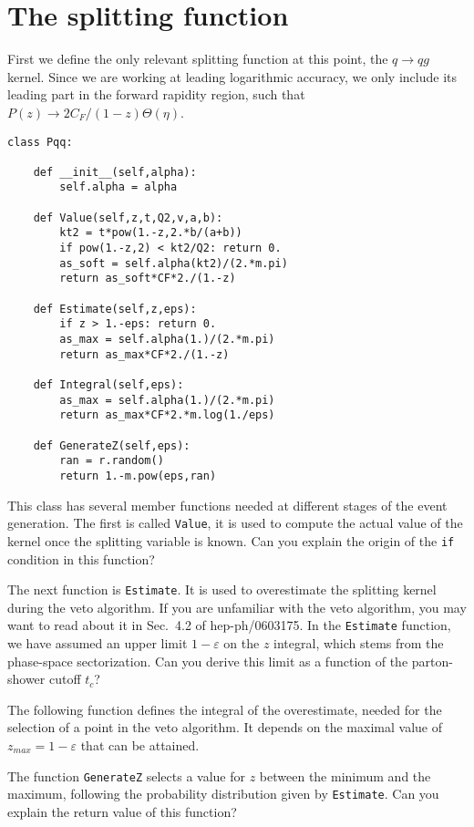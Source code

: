 \documentclass[10pt,fleqn]{scrartcl}
\begin{document}
\section{The splitting function}
First we define the only relevant splitting function at this point, the $q\to qg$ kernel.
Since we are working at leading logarithmic accuracy, we only include its leading part
in the forward rapidity region, such that $P(z)\to 2C_F/(1-z)\Theta(\eta)$.
\begin{verbatim}
class Pqq:

    def __init__(self,alpha):
        self.alpha = alpha

    def Value(self,z,t,Q2,v,a,b):
        kt2 = t*pow(1.-z,2.*b/(a+b))
        if pow(1.-z,2) < kt2/Q2: return 0.
        as_soft = self.alpha(kt2)/(2.*m.pi)
        return as_soft*CF*2./(1.-z)

    def Estimate(self,z,eps):
        if z > 1.-eps: return 0.
        as_max = self.alpha(1.)/(2.*m.pi)
        return as_max*CF*2./(1.-z)

    def Integral(self,eps):
        as_max = self.alpha(1.)/(2.*m.pi)
        return as_max*CF*2.*m.log(1./eps)

    def GenerateZ(self,eps):
        ran = r.random()
        return 1.-m.pow(eps,ran)

\end{verbatim}
This class has several member functions needed at different stages 
of the event generation. The first is called {\tt Value}, it is used 
to compute the actual value of the kernel once the splitting variable
is known. Can you explain the origin of the {\tt if} condition in this function?

The next function is {\tt Estimate}. It is used to overestimate the splitting 
kernel during the veto algorithm. If you are unfamiliar with the veto algorithm, 
you may want to read about it in Sec.~4.2 of hep-ph/0603175. In the {\tt Estimate}
function, we have assumed an upper limit $1-\varepsilon$ on the $z$ integral, 
which stems from the phase-space sectorization. Can you derive 
this limit as a function of the parton-shower cutoff $t_c$?

The following function defines the integral of the overestimate, needed
for the selection of a point in the veto algorithm. It depends on the
maximal value of $z_{max}=1-\varepsilon$ that can be attained.

The function {\tt GenerateZ} selects a value for $z$ between the minimum and the
maximum, following the probability distribution given by {\tt Estimate}.
Can you explain the return value of this function?
\end{document}
